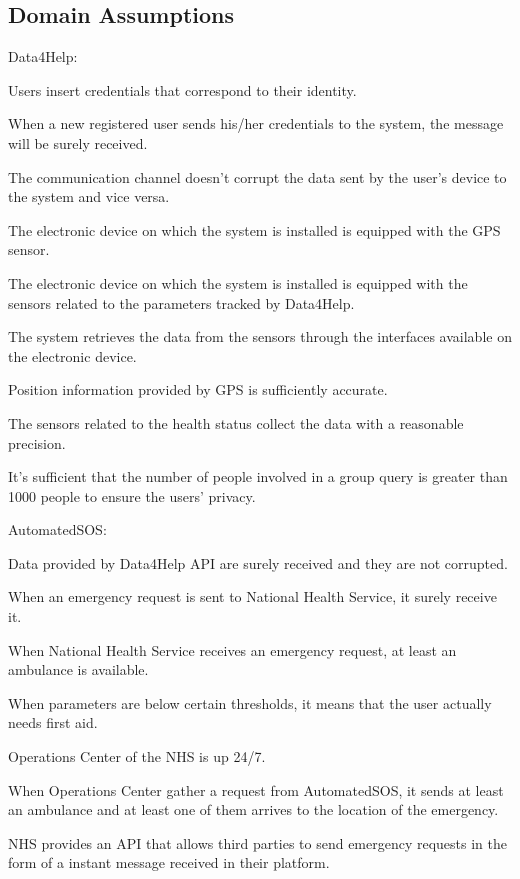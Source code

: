 \subsection{Domain Assumptions}
Data4Help:  
\begin{enumerate} [label={[D\arabic*]}]
    \item Users insert credentials that correspond to their identity.
    \item When a new registered user sends his/her credentials to the system, the message will be surely received.
    \item The communication channel doesn't corrupt the data sent by the user's device to the system and vice versa.
    \item The electronic device on which the system is installed is equipped with the GPS sensor.
    \item The electronic device on which the system is installed is equipped with the sensors related to the parameters tracked by Data4Help.
    \item The system retrieves the data from the sensors through the interfaces available on the electronic device.
    \item Position information provided by GPS is sufficiently accurate\cite{gps}.
    \item The sensors related to the health status collect the data with a reasonable precision.
    \item It's sufficient that the number of people involved in a group query is greater than 1000 people to ensure the users' privacy.
\end{enumerate}  
\noindent
AutomatedSOS:
\begin{enumerate} [resume, label={[D\arabic*]}]
    \item Data provided by Data4Help API are surely received and they are not corrupted.
    \item When an emergency request is sent to National Health Service, it surely receive it.
    \item When National Health Service receives an emergency request, at least an ambulance is available.
    \item When parameters are below certain thresholds, it means that the user actually needs first aid.
    \item Operations Center of the NHS is up 24/7.
    \item When Operations Center gather a request from AutomatedSOS, it sends at least an ambulance and at least one of them arrives to the location of the emergency.
    \item NHS provides an API that allows third parties to send emergency requests in the form of a instant message received in their platform.
\end{enumerate}
